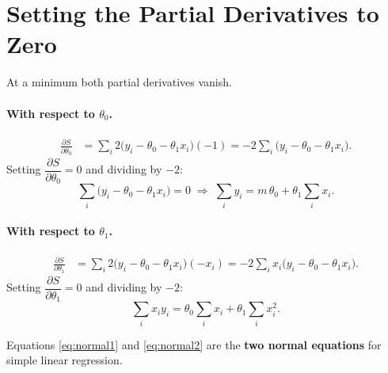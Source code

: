 \documentclass[11pt,a4paper]{report}
\theoremstyle{definition}
\theoremstyle{plain}
\theoremstyle{remark}
\begin{document}
	\section{Setting the Partial Derivatives to Zero}
	At a minimum both partial derivatives vanish.
	
	\paragraph{With respect to $\theta_0$.}
	\begin{align}
		\frac{\partial S}{\partial\theta_0}
		&=\sum_i 2\bigl(y_i-\theta_0-\theta_1 x_i\bigr)(-1)
		=-2\sum_i\bigl(y_i-\theta_0-\theta_1 x_i\bigr).
	\end{align}
	Setting $\dfrac{\partial S}{\partial\theta_0}=0$ and dividing by $-2$:
	\begin{equation}
		\sum_i\bigl(y_i-\theta_0-\theta_1 x_i\bigr)=0
		\;\Longrightarrow\;
		\sum_i y_i = m\,\theta_0+\theta_1\sum_i x_i .
		\label{eq:normal1}
	\end{equation}
	
	\paragraph{With respect to $\theta_1$.}
	\begin{align}
		\frac{\partial S}{\partial\theta_1}
		&=\sum_i 2\bigl(y_i-\theta_0-\theta_1 x_i\bigr)(-x_i)
		=-2\sum_i x_i\bigl(y_i-\theta_0-\theta_1 x_i\bigr).
	\end{align}
	Setting $\dfrac{\partial S}{\partial\theta_1}=0$ and dividing by $-2$:
	\begin{equation}
		\sum_i x_i y_i = \theta_0\sum_i x_i+\theta_1\sum_i x_i^2 .
		\label{eq:normal2}
	\end{equation}
	
	Equations \eqref{eq:normal1} and \eqref{eq:normal2} are the \textbf{two normal
		equations} for simple linear regression.
	
\end{document}
